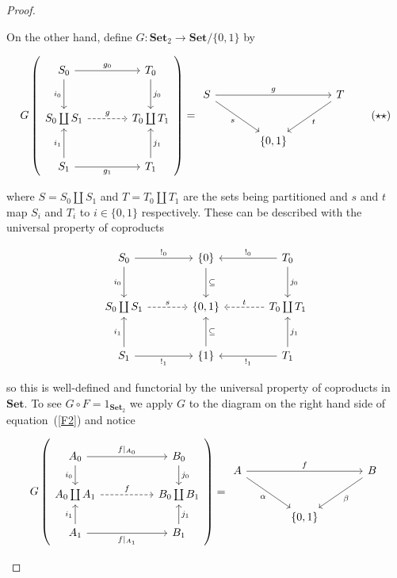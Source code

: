\documentclass[11pt]{amsart}
\theoremstyle{plain}
\theoremstyle{definition}
\newcommand{\Set}{{\mathbf{Set}}}
\newcommand{\noi}{{\noindent}}
\begin{document}
\begin{proof}
\begin{enumerate}
\noi On the other hand, define $G : \Set_2 \to \Set / \{0,1\}$ by 

\[ \label{G2} G\left( \begin{tikzcd}[column sep = large, row sep = large]
    S_0 \dar["i_0"'] \rar["g_0"] & T_0 \dar["j_0"]\\ 
    S_0 \coprod S_1 \rar[dashed, "g"]  & T_0 \coprod T_1\\
    S_1 \uar["i_1"] \rar["g_1"'] & T_1 \uar["j_1"'] 
    \end{tikzcd}\right) = 
\begin{tikzcd}[column sep = large, row sep = large]
S \ar[dr, "s"']\rar[rr,"g"] && T \ar[dl, "t"] \\
& \{ 0 , 1 \} & 
\end{tikzcd} \tag{$\star \star$}\]

\noi where $S = S_0 \coprod S_1$ and $T = T_0 \coprod T_1$ are the sets being partitioned and $s$ and $t$ map $S_i$ and $T_i$ to $i \in \{0,1\}$ respectively. These can be described with the universal property of coproducts

\[\begin{tikzcd}[column sep = large, row sep = large]
    S_0 \dar["i_0"'] \rar["!_0"] & \{0\}\dar["\subseteq "] & T_0 \dar["j_0"] \lar["!_0"']\\ 
    S_0 \coprod S_1 \rar[dashed, "s"]  & \{ 0,1 \} & T_0 \coprod T_1  \lar[dashed, "t"'] \\
    S_1 \uar["i_1"] \rar["!_1"'] & \{1\} \uar["\subseteq"'] & T_1 \lar["!_1"] \uar["j_1"']
    \end{tikzcd}\]


\noi so this is well-defined and functorial by the universal property of coproducts in $\Set$. To see $G \circ F = 1_{\Set_2}$ we apply $G$ to the diagram on the right hand side of equation~(\ref{F2}) and notice 

\[G \left(\begin{tikzcd}[column sep = huge]
A_0 \dar["i_0"'] \rar["f|_{A_0}"] & B_0 \dar["j_0"]\\ 
A_0 \coprod A_1 \rar[dashed, "f"]  & B_0 \coprod B_1\\
A_1 \uar["i_1"] \rar["f|_{A_1}"'] & B_1 \uar["j_1"'] 
\end{tikzcd}\right) = 
\begin{tikzcd}[column sep = large, row sep = large]
    A \ar[dr, "\alpha"']\rar[rr,"f"] && B \ar[dl, "\beta"] \\
    & \{ 0 , 1 \} & 
    \end{tikzcd}
\]


\end{enumerate}
\end{proof}
\end{document}

